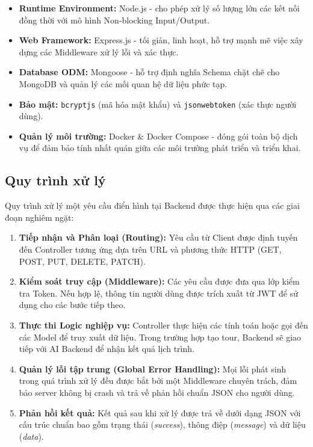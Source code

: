 \begin{itemize}
    \item \textbf{Runtime Environment:} Node.js - cho phép xử lý số lượng lớn các kết nối đồng thời với mô hình Non-blocking Input/Output.
    \item \textbf{Web Framework:} Express.js - tối giản, linh hoạt, hỗ trợ mạnh mẽ việc xây dựng các Middleware xử lý lỗi và xác thực.
    \item \textbf{Database ODM:} Mongoose \cite{mongoose} - hỗ trợ định nghĩa Schema chặt chẽ cho MongoDB và quản lý các mối quan hệ dữ liệu phức tạp.
    \item \textbf{Bảo mật:} \texttt{bcryptjs} \cite{bcryptjs} (mã hóa mật khẩu) và \texttt{jsonwebtoken} (xác thực người dùng).
    \item \textbf{Quản lý môi trường:} Docker \& Docker Compose - đóng gói toàn bộ dịch vụ để đảm bảo tính nhất quán giữa các môi trường phát triển và triển khai.
\end{itemize}

\subsection{Quy trình xử lý}
Quy trình xử lý một yêu cầu điển hình tại Backend được thực hiện qua các giai đoạn nghiêm ngặt:

\begin{enumerate}
    \item \textbf{Tiếp nhận và Phân loại (Routing):} Yêu cầu từ Client được định tuyến đến Controller tương ứng dựa trên URL và phương thức HTTP (GET, POST, PUT, DELETE, PATCH).
    \item \textbf{Kiểm soát truy cập (Middleware):} Các yêu cầu được đưa qua lớp kiểm tra Token. Nếu hợp lệ, thông tin người dùng được trích xuất từ JWT để sử dụng cho các bước tiếp theo.
    \item \textbf{Thực thi Logic nghiệp vụ:} Controller thực hiện các tính toán hoặc gọi đến các Model để truy xuất dữ liệu. Trong trường hợp tạo tour, Backend sẽ giao tiếp với AI Backend để nhận kết quả lịch trình.
    \item \textbf{Quản lý lỗi tập trung (Global Error Handling):} Mọi lỗi phát sinh trong quá trình xử lý đều được bắt bởi một Middleware chuyên trách, đảm bảo server không bị crash và trả về phản hồi chuẩn JSON cho người dùng.
    \item \textbf{Phản hồi kết quả:} Kết quả sau khi xử lý được trả về dưới dạng JSON với cấu trúc chuẩn bao gồm trạng thái (\textit{success}), thông điệp (\textit{message}) và dữ liệu (\textit{data}).
\end{enumerate}

